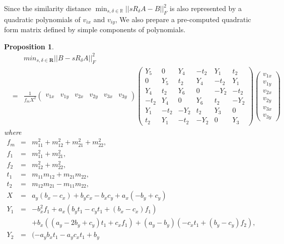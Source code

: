 \documentclass[8pt]{article}
\newtheorem{prop}{\bf Proposition}
\begin{document}
Since the similarity distance
$\min_{s,\delta \in \mathbb{R}}||sR_\delta A - B||_F^2$
is also represented by a quadratic polynomials of $v_{ix}$ and $v_{iy}$,
We also prepare a pre-computed
quadratic form matrix defined by simple components of polynomials.

\begin{prop}\label{prop:sim}
\begin{eqnarray*}
 &&min_{s,\delta\in\mathbf{R}}||B - sR_\delta A||^2_F\\
 &=&
\frac{1}{f_m X^2}
\left(
\begin{array}{cccccc}
 v_{1x} & v_{1y} & v_{2x} & v_{2y} & v_{3x} & v_{3y}
\end{array}
\right)
\left(
 \begin{array}{cccccc}
  Y_5 & 0 & Y_4 & -t_2 & Y_1 & t_2 \\
  0 & Y_5 & t_2 & Y_4 & -t_2 & Y_1 \\
  Y_4 & t_2 & Y_6 & 0 & -Y_2 & -t_2 \\
  -t_2 & Y_4 & 0 & Y_6 & t_2 & -Y_2 \\
  Y_1 & -t_2 & -Y_2 & t_2 & Y_3 & 0 \\
  t_2 & Y_1 & -t_2 & -Y_2 & 0 & Y_3
 \end{array}
\right)
\left(
\begin{array}{c}
 v_{1x} \\ v_{1y} \\ v_{2x} \\ v_{2y} \\ v_{3x}\\ v_{3y}
\end{array}
\right)
\end{eqnarray*}
where
\begin{eqnarray*}
 f_{m}&=&m_{11}^2+m_{12}^2+m_{21}^2+m_{22}^2, \\
 f_{1} &=&m_{11}^2+m_{21}^2, \\
 f_{2} &=&m_{12}^2+m_{22}^2, \\
 t_{1}&=&m_{11} m_{12}+m_{21} m_{22}, \\
 t_{2} &= & m_{12} m_{21}-m_{11} m_{22}, \\
 X &= & a_{y} (b_{x}-c_{x})+b_{y} c_{x}-b_{x} c_{y}+a_{x} (-b_{y}+c_{y}) \\
Y_1 &= & -b_{x}^2 f_{1}+a_{x} (b_{y} t_{1}-c_{y} t_{1}
 +(b_{x}-c_{x}) f_{1}) \\
 && +b_{x} ((a_{y}-2 b_{y}+c_{y}) t_{1}+c_{x} f_{1})
  +(a_{y}-b_{y}) (-c_{x} t_{1}+(b_{y}-c_{y}) f_{2}), \\
Y_2 &= &(-a_{y} b_{x} t_{1}-a_{y} c_{x} t_{1}+b_{y}

\end{eqnarray*}
\end{prop}
\end{document}
